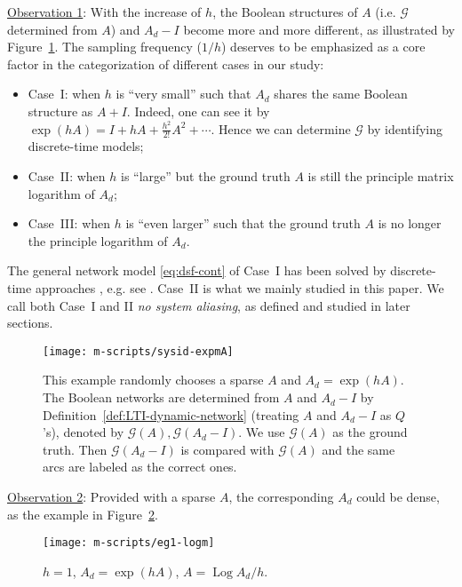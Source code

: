 \documentclass[letterpaper,10pt,journal,final]{IEEEtran}
\theoremstyle{definition}
\theoremstyle{remark}
\newcommand{\Log}{\operatorname{Log}}
\begin{document}
\smallskip
\noindent\underline{Observation 1}: With the increase of $h$, the Boolean structures of
$A$ (i.e. $\mathcal{G}$ determined from $A$) and $A_d - I$ become more and more different, as illustrated by Figure~\ref{fig:net-topol-A-Ad}.
  The sampling frequency ($1/h$) deserves to be emphasized as a core factor in the
  categorization of different cases in our study:
  \begin{itemize}
  \item {Case~I}: when $h$ is ``very small'' such that $A_d$ shares the same Boolean
    structure as $A+I$. Indeed, one can see it by
    $\exp(hA) = I + hA + \frac{h^2}{2!} A^2 + \cdots$. Hence we can determine
    $\mathcal{G}$ by identifying discrete-time models;
  \item {Case~II}: when $h$ is ``large'' but the ground truth $A$ is
    still the principle matrix logarithm of $A_d$;
  \item {Case~III}: when $h$ is ``even larger'' such that the ground truth $A$ is no
    longer the principle logarithm of $A_d$.
  \end{itemize}
The general network model \eqref{eq:dsf-cont} of {Case~I} has been solved by
  discrete-time approaches , e.g. see \cite{Yue2017a,Chiuso2012}.  {Case~II}
  is what we mainly studied in this paper. We call both {Case~I} and
  {II} \emph{no system aliasing}, as defined and studied in later sections.


\begin{figure}[htb]   \centering
  \texttt{[image: m-scripts/sysid-expmA]}
  \caption{This example randomly chooses a sparse $A$ and $A_d = \exp(hA)$. The
    Boolean networks are determined from $A$ and $A_d-I$ by
    Definition~\ref{def:LTI-dynamic-network} (treating $A$ and $A_d-I$ as $Q$'s),
    denoted by $\mathcal{G}(A), \mathcal{G}(A_d-I)$. We use $\mathcal{G}(A)$ as the
    ground truth. Then $\mathcal{G}(A_d -I)$ is compared with $\mathcal{G}(A)$ and
    the same arcs are labeled as the correct ones.}
  \label{fig:net-topol-A-Ad}
\end{figure}

\smallskip
\noindent\underline{Observation 2}: Provided with a sparse $A$, the corresponding $A_d$
could be dense, as the example in Figure~\ref{fig:logm-eg-1}.
\begin{figure}[htb]
  \centering
  \texttt{[image: m-scripts/eg1-logm]}
    \caption{$h = 1$, $A_d = \exp{(hA)}$, $A = \Log{A_d}/h$. }
    \label{fig:logm-eg-1}
\end{figure}
\end{document}
